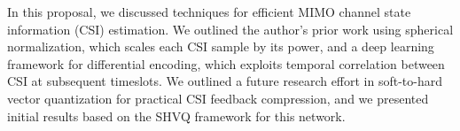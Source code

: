 
In this proposal, we discussed techniques for efficient MIMO channel state information (CSI) estimation. We outlined the author's prior work using spherical normalization, which scales each CSI sample by its power, and a deep learning framework for differential encoding, which exploits temporal correlation between CSI at subsequent timeslots. We outlined a future research effort in soft-to-hard vector quantization for practical CSI feedback compression, and we presented initial results based on the SHVQ framework for this network.